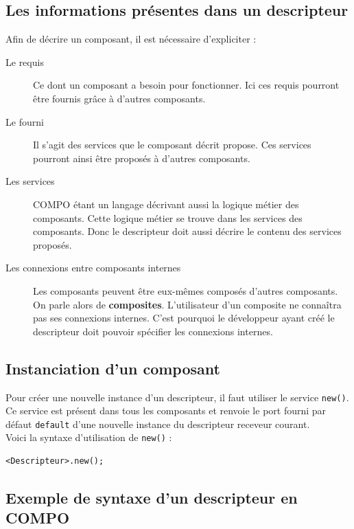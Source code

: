 \documentclass[11pt,a4paper,openany,oneside]{book}
\begin{document}
\subsection{Les informations présentes dans un descripteur}

Afin de décrire un composant, il est nécessaire d'expliciter :
\begin{description}
\item[Le requis]Ce dont un composant a besoin pour fonctionner. Ici ces requis pourront être fournis grâce à d'autres composants.
\item[Le fourni]Il s'agit des services que le composant décrit propose. Ces services pourront ainsi être proposés à d'autres composants.
\item[Les services]COMPO étant un langage décrivant aussi la logique métier des composants. Cette logique métier se trouve dans les services des composants. Donc le descripteur doit aussi décrire le contenu des services proposés.
\item[Les connexions entre composants internes]Les composants peuvent être eux-mêmes composés d'autres composants. On parle alors de \textbf{composites}. L'utilisateur d'un composite ne connaîtra pas ses connexions internes. C'est pourquoi le développeur ayant créé le descripteur doit pouvoir spécifier les connexions internes.
\end{description}


\subsection{Instanciation d'un composant}

Pour créer une nouvelle instance d'un descripteur, il faut utiliser le service \texttt{new()}.\\
Ce service est présent dans tous les composants et renvoie le port fourni par défaut \texttt{default} d'une nouvelle instance du descripteur receveur courant.\\
Voici la syntaxe d'utilisation de \texttt{new()} : 
\begin{lstlisting}[language=Compo, frame=single, caption=Syntaxe de création d'un nouveau composant]
<Descripteur>.new();
\end{lstlisting}

\subsection{Exemple de syntaxe d'un descripteur en COMPO}
\end{document}
